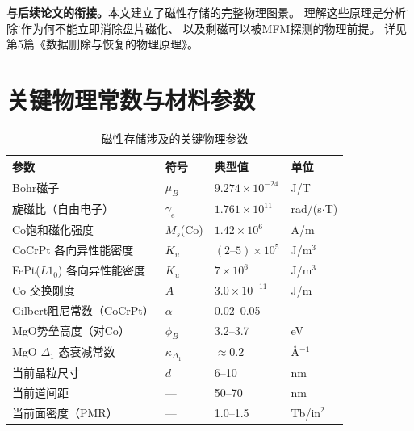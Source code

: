 \documentclass[11pt,a4paper,twoside]{article}
\theoremstyle{definition}
\theoremstyle{plain}
\theoremstyle{remark}
\begin{document}
\begin{physbox}
  \textbf{与后续论文的衔接。}本文建立了磁性存储的完整物理图景。
  理解这些原理是分析\"删除\"操作为何不能立即消除盘片磁化、
  以及剩磁可以被MFM探测的物理前提。
  详见第5篇《数据删除与恢复的物理原理》。
\end{physbox}

\appendix
\section{关键物理常数与材料参数}

\begin{table}[H]
\centering
\caption{磁性存储涉及的关键物理参数}
\begin{tabular}{@{}llll@{}}
\toprule
参数 & 符号 & 典型值 & 单位 \\
\midrule
Bohr磁子 & $\mu_B$ & $9.274 \times 10^{-24}$ & J/T \\
旋磁比（自由电子） & $\gamma_e$ & $1.761 \times 10^{11}$ & rad/(s$\cdot$T) \\
Co饱和磁化强度 & $M_s$(Co) & $1.42 \times 10^6$ & A/m \\
CoCrPt 各向异性能密度 & $K_u$ & $(2\text{--}5)\times 10^5$ & J/m$^3$ \\
FePt($L1_0$) 各向异性能密度 & $K_u$ & $7 \times 10^6$ & J/m$^3$ \\
Co 交换刚度 & $A$ & $3.0 \times 10^{-11}$ & J/m \\
Gilbert阻尼常数（CoCrPt） & $\alpha$ & 0.02--0.05 & — \\
MgO势垒高度（对Co） & $\phi_B$ & 3.2--3.7 & eV \\
MgO $\Delta_1$ 态衰减常数 & $\kappa_{\Delta_1}$ & $\approx 0.2$ & \AA$^{-1}$ \\
当前晶粒尺寸 & $d$ & 6--10 & nm \\
当前道间距 & — & 50--70 & nm \\
当前面密度（PMR） & — & 1.0--1.5 & Tb/in$^2$ \\
\bottomrule
\end{tabular}
\end{table}
\end{document}

